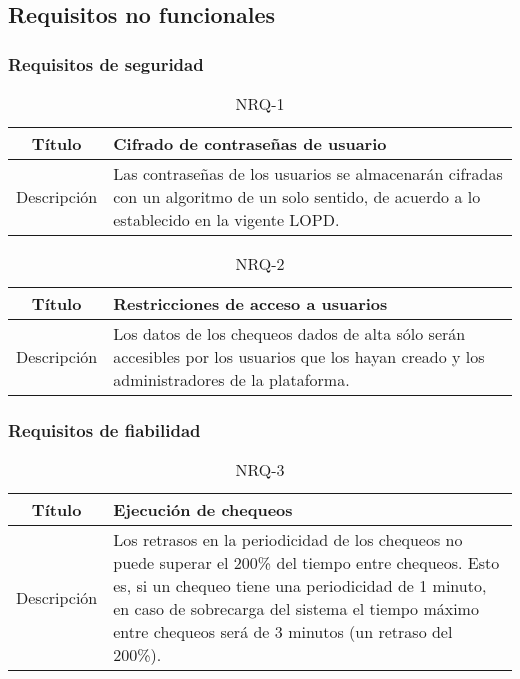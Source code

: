 \FloatBarrier
\subsection{Requisitos no funcionales}

\subsubsection{Requisitos de seguridad}

\begin{table}[h!]
  \centering
  \begin{tabularx}{\textwidth}{|c|X|}
    \hline
    Título & Cifrado de contraseñas de usuario \\

    \hline

    Descripción & Las contraseñas de los usuarios se almacenarán cifradas con un
    algoritmo de un solo sentido, de acuerdo a lo establecido en la vigente \ac{LOPD}. \\


    \hline
  \end{tabularx}
  \caption{NRQ-1}
\end{table}

\begin{table}[h!]
  \centering
  \begin{tabularx}{\textwidth}{|c|X|}
    \hline
    Título & Restricciones de acceso a usuarios \\

    \hline

    Descripción & Los datos de los chequeos dados de alta sólo serán accesibles
    por los usuarios que los hayan creado y los administradores de la plataforma. \\


    \hline
  \end{tabularx}
  \caption{NRQ-2}
\end{table}

\FloatBarrier
\subsubsection{Requisitos de fiabilidad}


\begin{table}[h!]
  \centering
  \begin{tabularx}{\textwidth}{|c|X|}
    \hline
    Título & Ejecución de chequeos \\

    \hline

    Descripción & Los retrasos en la periodicidad de los chequeos no puede
    superar el 200\% del tiempo entre chequeos. Esto es, si un chequeo tiene una
    periodicidad de 1 minuto, en caso de sobrecarga del sistema el tiempo máximo
    entre chequeos será de 3 minutos (un retraso del 200\%). \\

    \hline
  \end{tabularx}
  \caption{NRQ-3}
\end{table}


